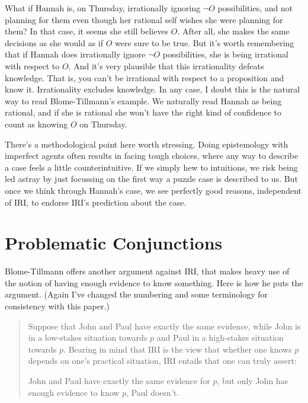 \documentclass[oneside]{book}
\renewcommand{\numbex}[2]{
\begin{enumerate*}
\setcounter{enumi}{\value{paper}}
\renewcommand{\labelenumi}{(\arabic{enumi})}
#2
\end{enumerate*}
\addtocounter{paper}{#1}}
\begin{document}
What if Hannah is, on Thursday, irrationally ignoring $\neg O$ possibilities, and not planning for them even though her rational self wishes she were planning for them? In that case, it seems she still believes $O$. After all, she makes the same decisions as she would as if $O$ were sure to be true. But it's worth remembering that if Hannah does irrationally ignore $\neg O$ possibilities, she is being irrational with respect to $O$. And it's very plausible that this irrationality defeats knowledge. That is, you can't be irrational with respect to a proposition and know it. Irrationality excludes knowledge. In any case, I doubt this is the natural way to read Blome-Tillmann's example. We naturally read Hannah as being rational, and if she is rational she won't have the right kind of confidence to count as knowing $O$ on Thursday.

There's a methodological point here worth stressing. Doing epistemology with imperfect agents often results in facing tough choices, where any way to describe a case feels a little counterintuitive. If we simply hew to intuitions, we risk being led astray by just focussing on the first way a puzzle case is described to us. But once we think through Hannah's case, we see perfectly good reasons, independent of IRI, to endorse IRI's prediction about the case.

\section{Problematic Conjunctions} \label{sect:conj}
Blome-Tillmann offers another argument against IRI, that makes heavy use of the notion of having enough evidence to know something. Here is how he puts the argument. (Again I've changed the numbering and some terminology for consistency with this paper.)

\begin{quote}
\noindent Suppose that John and Paul have exactly the same evidence, while John is in a low-stakes situation towards $p$ and Paul in a high-stakes situation towards $p$. Bearing in mind that IRI is the view that whether one knows $p$ depends on one's practical situation, IRI entails that one can truly assert:

\numbex{1}{
\item \label{SameEv} John and Paul have exactly the same evidence for $p$, but only John has enough evidence to know $p$, Paul doesn't.} \cite[328-9]{MBT2009}
\end{quote}
\end{document}
